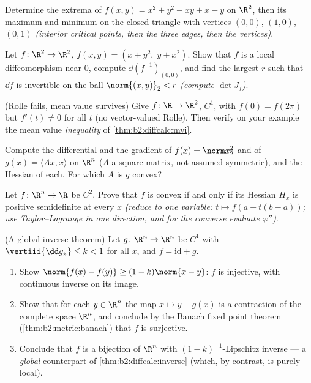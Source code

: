 \begin{exercise}[$\star\star$]\label{exo:b2:diffcalc:7}
Determine the extrema of $f(x, y) = x^2 + y^2 - xy + x - y$ on
$\R^2$, then its maximum and minimum on the closed triangle with
vertices $(0,0)$, $(1,0)$, $(0,1)$ \emph{(interior critical points,
then the three edges, then the vertices)}.
\end{exercise}

\begin{exercise}[$\star\star\star$]\label{exo:b2:diffcalc:8}
Let $f \colon \R^2 \to \R^2$, $f(x, y) = (x + y^2,\; y + x^2)$.
Show that $f$ is a local diffeomorphism near $0$, compute
$\dd(f^{-1})_{(0,0)}$, and find the largest $r$ such that $\dd f$
is invertible on the ball $\norm{(x,y)}_2 < r$ \emph{(compute
$\det J_f$)}.
\end{exercise}

\begin{exercise}[$\star\star\star$]\label{exo:b2:diffcalc:9}
(Rolle fails, mean value survives) Give $f \colon \R \to \R^2$,
$C^1$, with $f(0) = f(2\pi)$ but $f'(t) \neq 0$ for all $t$
(no vector-valued Rolle). Then verify on your example the
mean value \emph{inequality} of \cref{thm:b2:diffcalc:mvi}.
\end{exercise}

\begin{exercise}[$\star$]\label{exo:b2:diffcalc:10}
Compute the differential and the gradient of $f(x) = \norm
x_2^2$ and of $g(x) = \langle Ax, x\rangle$ on $\R^n$ ($A$ a
square matrix, not assumed symmetric), and the Hessian of each.
For which $A$ is $g$ convex?
\end{exercise}

\begin{exercise}[$\star\star$]\label{exo:b2:diffcalc:11}
Let $f \colon \R^n \to \R$ be $C^2$. Prove that $f$ is convex if
and only if its Hessian $H_x$ is positive semidefinite at every
$x$ \emph{(reduce to one variable: $t \mapsto f(a + t(b-a))$;
use Taylor--Lagrange in one direction, and for the converse
evaluate $\varphi''$)}.
\end{exercise}

\begin{exercise}[$\star\star\star$]\label{exo:b2:diffcalc:12}
(A global inverse theorem) Let $g \colon \R^n \to \R^n$ be $C^1$
with $\vertiii{\dd g_x} \leq k < 1$ for all $x$, and $f =
\mathrm{id} + g$.
\begin{enumerate}
  \item Show $\norm{f(x) - f(y)} \geq (1 - k)\norm{x - y}$: $f$
        is injective, with continuous inverse on its image.
  \item Show that for each $y \in \R^n$ the map $x \mapsto y -
        g(x)$ is a contraction of the complete space $\R^n$,
        and conclude by the Banach fixed point theorem
        (\cref{thm:b2:metric:banach}) that $f$ is surjective.
  \item Conclude that $f$ is a bijection of $\R^n$ with
        $(1-k)^{-1}$-Lipschitz inverse --- a \emph{global}
        counterpart of \cref{thm:b2:diffcalc:inverse} (which,
        by contrast, is purely local).
\end{enumerate}
\end{exercise}

